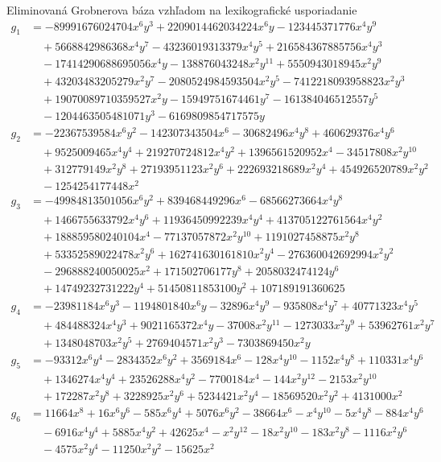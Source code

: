 Eliminovaná Grobnerova báza vzhľadom na lexikografické usporiadanie
\begin{align*}
g_1 &= -89991676024704x^6y^3 + 2209014462034224x^6y - 123445371776x^4y^9 \\ 
&\quad + 5668842986368x^4y^7 - 43236019313379x^4y^5 + 216584367885756x^4y^3 \\ 
&\quad - 17414290688695056x^4y - 138876043248x^2y^11 + 5550943018945x^2y^9\\ 
&\quad + 43203483205279x^2y^7 - 2080524984593504x^2y^5 - 7412218093958823x^2y^3 \\ 
&\quad + 19070089710359527x^2y - 15949751674461y^7 - 161384046512557y^5  \\ 
&\quad - 1204463505481071y^3 - 6169809854717575y \\
g_2 &= -22367539584x^6y^2 - 142307343504x^6 - 30682496x^4y^8  + 460629376x^4y^6 \\ 
&\quad + 9525009465x^4y^4 + 219270724812x^4y^2 + 1396561520952x^4 - 34517808x^2y^{10} \\ 
&\quad  + 312779149x^2y^8 + 27193951123x^2y^6 + 222693218689x^2y^4 + 454926520789x^2y^2  \\ 
&\quad - 1254254177448x^2 \\
g_3 &= -49984813501056x^6y^2 + 839468449296x^6 - 68566273664x^4y^8 \\ 
&\quad  + 1466755633792x^4y^6 + 11936450992239x^4y^4 + 413705122761564x^4y^2 \\ 
&\quad  + 188859580240104x^4 - 77137057872x^2y^{10} + 1191027458875x^2y^8 \\ 
&\quad  + 53352589022478x^2y^6  + 162741630161810x^2y^4 - 276360042692994x^2y^2 \\ 
&\quad - 296888240050025x^2 + 171502706177y^8 + 2058032474124y^6  \\ 
&\quad + 14749232731222y^4 + 51450811853100y^2 + 107189191360625 \\
g_4 &= -23981184x^6y^3 - 1194801840x^6y - 32896x^4y^9  - 935808x^4y^7 + 40771323x^4y^5 \\ 
&\quad + 484488324x^4y^3 + 9021165372x^4y - 37008x^2y^{11} - 1273033x^2y^9 + 53962761x^2y^7 \\ 
&\quad   + 1348048703x^2y^5 + 2769404571x^2y^3 - 7303869450x^2y \\ 
g_5 &= -93312x^6y^4 - 2834352x^6y^2 + 3569184x^6 - 128x^4y^{10}  - 1152x^4y^8 + 110331x^4y^6 \\ 
&\quad  + 1346274x^4y^4 + 23526288x^4y^2 - 7700184x^4 - 144x^2y^{12} - 2153x^2y^{10}  \\ 
&\quad  + 172287x^2y^8 + 3228925x^2y^6 + 5234421x^2y^4 - 18569520x^2y^2 + 4131000x^2 \\ 
g_6 &= 11664x^8 + 16x^6y^6 - 585x^6y^4 + 5076x^6y^2 - 38664x^6  - x^4y^{10} - 5x^4y^8 - 884x^4y^6 \\ 
&\quad - 6916x^4y^4 + 5885x^4y^2 + 42625x^4 - x^2y^{12} - 18x^2y^{10} - 183x^2y^8 - 1116x^2y^6 \\ 
&\quad  - 4575x^2y^4 - 11250x^2y^2 - 15625x^2\\ 
\end{align*}

